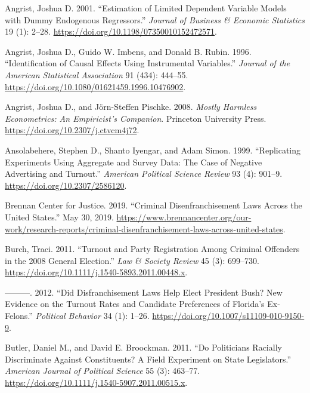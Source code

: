 \documentclass[
  12pt,
]{article}
\newlength{\cslhangindent}
\newenvironment{cslreferences}%
  {\setlength{\parindent}{0pt}%
  \everypar{\setlength{\hangindent}{\cslhangindent}}\ignorespaces}%
  {\par}
\begin{document}
\hypertarget{refs}{}
\begin{cslreferences}
\leavevmode\hypertarget{ref-Angrist2001}{}%
Angrist, Joshua D. 2001. ``Estimation of Limited Dependent Variable Models with Dummy Endogenous Regressors.'' \emph{Journal of Business \& Economic Statistics} 19 (1): 2--28. \url{https://doi.org/10.1198/07350010152472571}.

\leavevmode\hypertarget{ref-Angrist1996}{}%
Angrist, Joshua D., Guido W. Imbens, and Donald B. Rubin. 1996. ``Identification of Causal Effects Using Instrumental Variables.'' \emph{Journal of the American Statistical Association} 91 (434): 444--55. \url{https://doi.org/10.1080/01621459.1996.10476902}.

\leavevmode\hypertarget{ref-Angrist2008}{}%
Angrist, Joshua D., and Jörn-Steffen Pischke. 2008. \emph{Mostly Harmless Econometrics: An Empiricist's Companion}. Princeton University Press. \url{https://doi.org/10.2307/j.ctvcm4j72}.

\leavevmode\hypertarget{ref-Ansolabehere1999}{}%
Ansolabehere, Stephen D., Shanto Iyengar, and Adam Simon. 1999. ``Replicating Experiments Using Aggregate and Survey Data: The Case of Negative Advertising and Turnout.'' \emph{American Political Science Review} 93 (4): 901--9. \url{https://doi.org/10.2307/2586120}.

\leavevmode\hypertarget{ref-bcj_laws}{}%
Brennan Center for Justice. 2019. ``Criminal Disenfranchisement Laws Across the United States.'' May 30, 2019. \url{https://www.brennancenter.org/our-work/research-reports/criminal-disenfranchisement-laws-across-united-states}.

\leavevmode\hypertarget{ref-Burch2011}{}%
Burch, Traci. 2011. ``Turnout and Party Registration Among Criminal Offenders in the 2008 General Election.'' \emph{Law \& Society Review} 45 (3): 699--730. \url{https://doi.org/10.1111/j.1540-5893.2011.00448.x}.

\leavevmode\hypertarget{ref-Burch2012}{}%
---------. 2012. ``Did Disfranchisement Laws Help Elect President Bush? New Evidence on the Turnout Rates and Candidate Preferences of Florida's Ex-Felons.'' \emph{Political Behavior} 34 (1): 1--26. \url{https://doi.org/10.1007/s11109-010-9150-9}.

\leavevmode\hypertarget{ref-Butler2011}{}%
Butler, Daniel M., and David E. Broockman. 2011. ``Do Politicians Racially Discriminate Against Constituents? A Field Experiment on State Legislators.'' \emph{American Journal of Political Science} 55 (3): 463--77. \url{https://doi.org/10.1111/j.1540-5907.2011.00515.x}.


\end{cslreferences}
\end{document}
